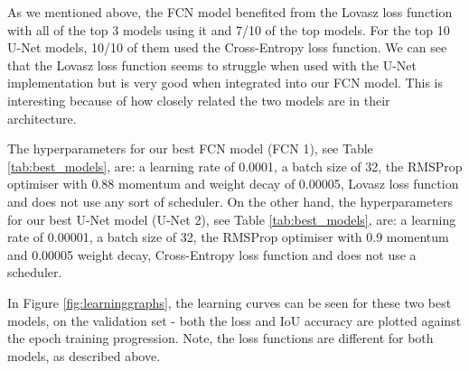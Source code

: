 \documentclass{article}
\begin{document}
As we mentioned above, the FCN model benefited from the Lovasz loss function with all of the top 3 models using it and 7/10 of the top models. For the top 10 U-Net models, 10/10 of them used the Cross-Entropy loss function. We can see that the Lovasz loss function seems to struggle when used with the U-Net implementation but is very good when integrated into our FCN model. This is interesting because of how closely related the two models are in their architecture. 

The hyperparameters for our best FCN model (FCN 1), see Table \ref{tab:best_models}, are: a learning rate of 0.0001, a batch size of 32, the RMSProp optimiser with 0.88 momentum and weight decay of 0.00005, Lovasz loss function and does not use any sort of scheduler. On the other hand, the hyperparameters for our best U-Net model (U-Net 2), see Table \ref{tab:best_models}, are: a learning rate of 0.00001, a batch size of 32, the RMSProp optimiser with 0.9 momentum and 0.00005 weight decay, Cross-Entropy loss function and does not use a scheduler. 

In Figure \ref{fig:learninggraphs}, the learning curves can be seen for these two best models, on the validation set - both the loss and IoU accuracy are plotted against the epoch training progression. Note, the loss functions are different for both models, as described above.
\end{document}
